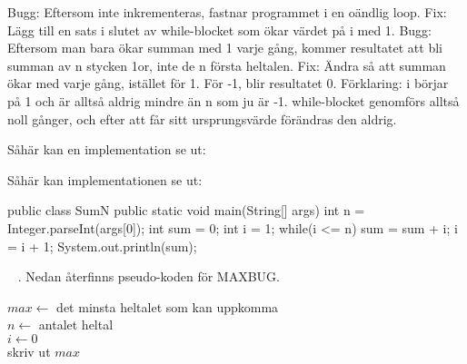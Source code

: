\SOLUTION


\TaskSolved \what


\SubtaskSolved  Bugg: Eftersom  inte inkrementeras, fastnar programmet i en oändlig loop. Fix: Lägg till en sats i slutet av while-blocket som ökar värdet på i med 1.
Bugg: Eftersom man bara ökar summan med 1 varje gång, kommer resultatet att bli summan av n stycken 1or, inte de n första heltalen. Fix: Ändra så att summan ökar med  varje gång, istället för 1.
För -1, blir resultatet 0. Förklaring: i börjar på 1 och är alltså aldrig mindre än n som ju är -1. while-blocket genomförs alltså noll gånger, och efter att  får sitt ursprungsvärde förändras den aldrig.

Såhär kan en implementation se ut:



\SubtaskSolved {} 

Såhär kan implementationen se ut:
\begin{Code}[language=Java]
public class SumN {
  public static void main(String[] args) {
    int n = Integer.parseInt(args[0]);
    int sum = 0;
    int i = 1;
    while(i <= n){
      sum = sum + i;
      i = i + 1;
      }
    }
    System.out.println(sum);
}
\end{Code}

\QUESTEND



\clearpage

\ExtraTasks %





\QUESTBEGIN

\Task  \what~ . Nedan återfinns pseudo-koden för MAXBUG.

\begin{algorithm}[H]

 $max \leftarrow$ det minsta heltalet som kan uppkomma  \\
 $n \leftarrow $ antalet heltal \\
 $i \leftarrow 0$ \\
 skriv ut $max$
\end{algorithm}

